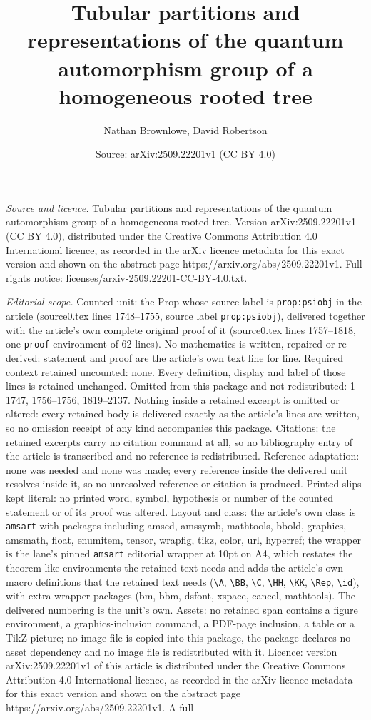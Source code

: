 \documentclass[10pt,a4paper]{amsart}
\title[Tubular partitions and representations of the quantum automo]{Tubular partitions and representations of the quantum automorphism group of a homogeneous rooted tree}
\author{Nathan Brownlowe, David Robertson}
\date{Source: arXiv:2509.22201v1 (CC BY 4.0)}
\begin{document}
\maketitle

\noindent\emph{Source and licence.} Tubular partitions and representations of the quantum automorphism group of a homogeneous rooted tree. Version arXiv:2509.22201v1 (CC BY 4.0), distributed under the Creative Commons Attribution 4.0 International licence, as recorded in the arXiv licence metadata for this exact version and shown on the abstract page https://arxiv.org/abs/2509.22201v1. Full rights notice: licenses/arxiv-2509.22201-CC-BY-4.0.txt.\par\smallskip

\noindent\textit{Editorial scope.} Counted unit: the Prop whose source label is \texttt{prop:psiobj} in the article (source0.tex lines 1748--1755, source label \texttt{prop:psiobj}), delivered together with the article's own complete original proof of it (source0.tex lines 1757--1818, one \texttt{proof} environment of 62 lines). No mathematics is written, repaired or re-derived: statement and proof are the article's own text line for line. Required context retained uncounted: none. Every definition, display and label of those lines is retained unchanged. Omitted from this package and not redistributed: 1--1747, 1756--1756, 1819--2137. Nothing inside a retained excerpt is omitted or altered: every retained body is delivered exactly as the article's lines are written, so no omission receipt of any kind accompanies this package. Citations: the retained excerpts carry no citation command at all, so no bibliography entry of the article is transcribed and no reference is redistributed. Reference adaptation: none was needed and none was made; every reference inside the delivered unit resolves inside it, so no unresolved reference or citation is produced. Printed slips kept literal: no printed word, symbol, hypothesis or number of the counted statement or of its proof was altered. Layout and class: the article's own class is \texttt{amsart} with packages including amscd, amssymb, mathtools, bbold, graphics, amsmath, float, enumitem, tensor, wrapfig, tikz, color, url, hyperref; the wrapper is the lane's pinned \texttt{amsart} editorial wrapper at 10pt on A4, which restates the theorem-like environments the retained text needs and adds the article's own macro definitions that the retained text needs (\texttt{\textbackslash A}, \texttt{\textbackslash BB}, \texttt{\textbackslash C}, \texttt{\textbackslash HH}, \texttt{\textbackslash KK}, \texttt{\textbackslash Rep}, \texttt{\textbackslash id}), with extra wrapper packages (bm, bbm, dsfont, xspace, cancel, mathtools). The delivered numbering is the unit's own. Assets: no retained span contains a figure environment, a graphics-inclusion command, a PDF-page inclusion, a table or a TikZ picture; no image file is copied into this package, the package declares no asset dependency and no image file is redistributed with it. Licence: version arXiv:2509.22201v1 of this article is distributed under the Creative Commons Attribution 4.0 International licence, as recorded in the arXiv licence metadata for this exact version and shown on the abstract page https://arxiv.org/abs/2509.22201v1. A full 
\end{document}

